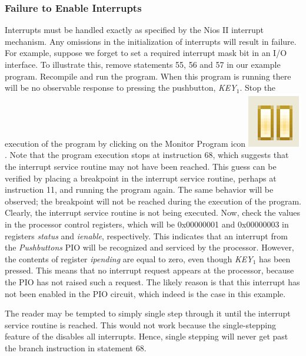 \documentclass[11pt, twoside, pdftex]{article}
\begin{document}
\subsubsection{Failure to Enable Interrupts}
Interrupts must be handled exactly as specified by the Nios II interrupt mechanism.
Any omissions in the initialization of interrupts will result in failure. For example,
suppose we forget to set a required interrupt mask bit in an I/O interface.
To illustrate this, remove statements 55, 56 and 57 in our example program.
Recompile and run the program. When this program is running there will be no
observable response to pressing the pushbutton, {\it KEY}$_1$.
Stop the execution of the program by clicking on the Monitor Program
icon \includegraphics[scale=1]{figures/icon1.png}.
Note that the program execution stops at instruction 68, which suggests that
the interrupt service routine may not have been reached.
This guess can be verified by placing a breakpoint in the interrupt service routine,
perhaps at instruction 11, and running the program again.
The same behavior will be observed; the breakpoint will not be reached during
the execution of the program. Clearly, the interrupt service routine is not being executed. 
Now, check the values in the processor control registers, which will be 0x00000001
and 0x00000003 in registers {\it status} and {\it ienable}, respectively. 
This indicates that an interrupt from the {\it Pushbuttons} PIO will be
recognized and serviced by the processor. However, the contents of register
{\it ipending} are equal to zero, even though {\it KEY}$_1$ has been pressed.
This means that no interrupt request appears at the processor, because the
PIO has not raised such a request. The likely reason is that this interrupt
has not been enabled in the PIO circuit, which indeed is the case in this example.

The reader may be tempted to simply single step through it until the interrupt service routine is reached.
This would not work because the single-stepping feature of the \productNameMed{} disables all interrupts. 
Hence, single stepping will never get past the branch instruction in statement 68.
\end{document}

